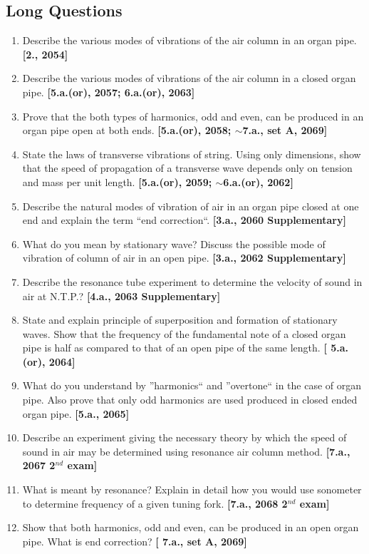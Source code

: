 \documentclass[a4paper,10pt]{report}
\begin{document}
 \subsection{Long Questions}
  \begin{enumerate}
   \item Describe the various modes of vibrations of the air column in an organ pipe. \textbf{[2., 2054]}
   \item Describe the various modes of vibrations of the air column in a closed organ pipe. \textbf{[5.a.(or), 2057;
    6.a.(or), 2063]}
   \item Prove that the both types of harmonics, odd and even, can be produced in an organ pipe open at both ends. 
    \textbf{[5.a.(or), 2058; $\sim$7.a., set A, 2069]}
   \item State the laws of transverse vibrations of string. Using only dimensions, show that the speed of propagation of a
    transverse wave depends only on tension and mass per unit length. \textbf{[5.a.(or), 2059; $\sim$6.a.(or), 2062]}
   \item Describe the natural modes of vibration of air in an organ pipe closed at one end and explain the term ``end 
    correction``. \textbf{[3.a., 2060 Supplementary]}
   \item What do you mean by stationary wave? Discuss the possible mode of vibration of column of air in an open pipe. 
    \textbf{[3.a., 2062 Supplementary]}
   \item Describe the resonance tube experiment to determine the velocity of sound in air at N.T.P.? 
    \textbf{[4.a., 2063 Supplementary]}
   \item State and explain principle of superposition and formation of stationary waves. Show that the frequency of the 
    fundamental note of a closed organ pipe is half as compared to that of an open pipe of the same length. \textbf{[
    5.a.(or), 2064]}
   \item What do you understand by ''harmonics`` and ''overtone`` in the case of organ pipe. Also prove that only odd
    harmonics are used produced in closed ended organ pipe. \textbf{[5.a., 2065]}
   \item Describe an experiment giving the necessary theory by which the speed of sound in air may be determined using
    resonance air column method. \textbf{[7.a., 2067 2$^{nd}$ exam]}
   \item What is meant by resonance? Explain in detail how you would use sonometer to determine frequency of a given tuning
    fork. \textbf{[7.a., 2068 2$^{nd}$ exam]}
   \item Show that both harmonics, odd and even, can be produced in an open organ pipe. What is end correction? \textbf{[
    7.a., set A, 2069]}
  \end{enumerate}
 
\end{document}
